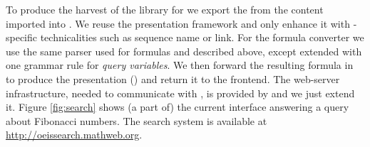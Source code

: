To produce the harvest of the \oeis library for \mwss we export the \html from the content
imported into \mmt. We reuse the \mmt presentation framework and only enhance it with
\oeis-specific technicalities such as sequence name or \oeis link. For the formula
converter we use the same parser used for \oeis formulas and described above, except
extended with one grammar rule for \mwss \emph{query variables}. We then forward the
resulting formula in \mmt to produce the presentation (\mathml) and return it to the \mwss
frontend.  The web-server infrastructure, needed to communicate with \mwss, is provided by
\mmt and we just extend it. Figure \ref{fig:search} shows (a part of) the current
interface answering a query about Fibonacci numbers. The search system is available at
\url{http://oeissearch.mathweb.org}.



